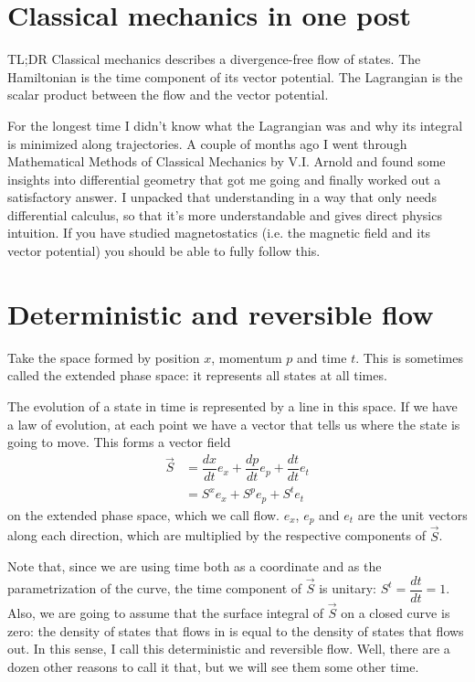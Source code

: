 \documentclass[aps,pra,10pt,floatfix,nofootinbib]{revtex4-1}
\theoremstyle{definition}
\begin{document}
	
\section{Classical mechanics in one post}

TL;DR Classical mechanics describes a divergence-free flow of states. The Hamiltonian is the time component of its vector potential. The Lagrangian is the scalar product between the flow and the vector potential.

For the longest time I didn't know what the Lagrangian was and why its integral is minimized along trajectories. A couple of months ago I went through Mathematical Methods of Classical Mechanics by V.I. Arnold and found some insights into differential geometry that got me going and finally worked out a satisfactory answer. I unpacked that understanding in a way that only needs differential calculus, so that it's more understandable and gives direct physics intuition. If you have studied magnetostatics (i.e. the magnetic field and its vector potential) you should be able to fully follow this.

\section{Deterministic and reversible flow}

Take the space formed by position $x$, momentum $p$ and time $t$. This is sometimes called the extended phase space: it represents all states at all times.

The evolution of a state in time is represented by a line in this space. If we have a law of evolution, at each point we have a vector that tells us where the state is going to move. This forms a vector field
\begin{equation}
\begin{aligned}
\vec{S} &= \dfrac{dx}{dt} e_x + \dfrac{dp}{dt} e_p + \dfrac{dt}{dt} e_t \\ 
&= S^x e_x + S^p e_p + S^t e_t 
\end{aligned}
\label{flow}
\end{equation}
 on the extended phase space, which we call flow. $e_x$, $e_p$ and $e_t$ are the unit vectors along each direction, which are multiplied by the respective components of $\vec{S}$.

Note that, since we are using time both as a coordinate and as the parametrization of the curve, the time component of $\vec{S}$ is unitary: $S^t = \dfrac{dt}{dt} = 1$. Also, we are going to assume that the surface integral of $\vec{S}$ on a closed curve is zero: the density of states that flows in is equal to the density of states that flows out. In this sense, I call this deterministic and reversible flow. Well, there are a dozen other reasons to call it that, but we will see them some other time.
\end{document}
